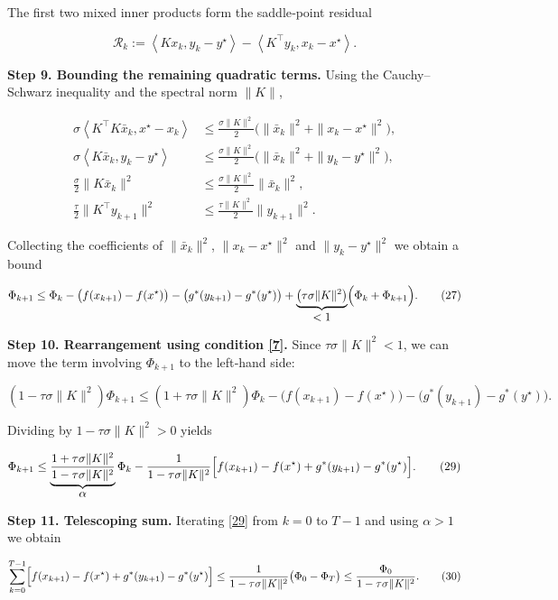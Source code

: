 \documentclass{article}
\newcommand{\inner}[2]{\left\langle #1,#2\right\rangle}
\begin{document}
The first two mixed inner products form the saddle‑point residual  

\[
\mathcal R_{k}:=
\inner{Kx_{k}}{y_{k}-y^{\star}}-\inner{K^{\!\top}y_{k}}{x_{k}-x^{\star}}.
\tag{25}
\]

\noindent\textbf{Step 9.  Bounding the remaining quadratic terms.}  
Using the Cauchy–Schwarz inequality and the spectral norm $\|K\|$,

\[
\begin{aligned}
\sigma\inner{K^{\!\top}K\bar x_{k}}{x^{\star}-x_{k}}
&\le \frac{\sigma\|K\|^{2}}{2}\bigl(\|\bar x_{k}\|^{2}+\|x_{k}-x^{\star}\|^{2}\bigr),\\
\sigma\inner{K\bar x_{k}}{y_{k}-y^{\star}}
&\le \frac{\sigma\|K\|^{2}}{2}\bigl(\|\bar x_{k}\|^{2}+\|y_{k}-y^{\star}\|^{2}\bigr),\\
\frac{\sigma}{2}\|K\bar x_{k}\|^{2}
&\le \frac{\sigma\|K\|^{2}}{2}\|\bar x_{k}\|^{2},\\
\frac{\tau}{2}\|K^{\!\top}y_{k+1}\|^{2}
&\le \frac{\tau\|K\|^{2}}{2}\|y_{k+1}\|^{2}.
\end{aligned}
\tag{26}
\]

Collecting the coefficients of $\|\bar x_{k}\|^{2}$, $\|x_{k}-x^{\star}\|^{2}$
and $\|y_{k}-y^{\star}\|^{2}$ we obtain a bound

\[
\Phi_{k+1}\le \Phi_{k}
-\bigl(f(x_{k+1})-f(x^{\star})\bigr)
-\bigl(g^{*}(y_{k+1})-g^{*}(y^{\star})\bigr)
+\underbrace{\bigl(\tau\sigma\|K\|^{2}\bigr)}_{\displaystyle <1}
\Bigl(\Phi_{k}+\Phi_{k+1}\Bigr).
\tag{27}
\]

\noindent\textbf{Step 10.  Rearrangement using condition \eqref{7}.}  
Since $\tau\sigma\|K\|^{2}<1$, we can move the term involving
$\Phi_{k+1}$ to the left‑hand side:

\[
(1-\tau\sigma\|K\|^{2})\Phi_{k+1}
\le (1+\tau\sigma\|K\|^{2})\Phi_{k}
-\bigl(f(x_{k+1})-f(x^{\star})\bigr)
-\bigl(g^{*}(y_{k+1})-g^{*}(y^{\star})\bigr).
\tag{28}
\]

Dividing by $1-\tau\sigma\|K\|^{2}>0$ yields

\[
\Phi_{k+1}
\le \underbrace{\frac{1+\tau\sigma\|K\|^{2}}{1-\tau\sigma\|K\|^{2}}}_{\displaystyle \alpha}
\Phi_{k}
-\frac{1}{1-\tau\sigma\|K\|^{2}}
\Bigl[
f(x_{k+1})-f(x^{\star})
+g^{*}(y_{k+1})-g^{*}(y^{\star})
\Bigr].
\tag{29}
\]

\noindent\textbf{Step 11.  Telescoping sum.}  
Iterating \eqref{29} from $k=0$ to $T-1$ and using $\alpha>1$ we obtain

\[
\sum_{k=0}^{T-1}
\Bigl[f(x_{k+1})-f(x^{\star})+g^{*}(y_{k+1})-g^{*}(y^{\star})\Bigr]
\le
\frac{1}{1-\tau\sigma\|K\|^{2}}
\bigl(\Phi_{0}-\Phi_{T}\bigr)
\le
\frac{\Phi_{0}}{1-\tau\sigma\|K\|^{2}}.
\tag{30}
\]
\end{document}
